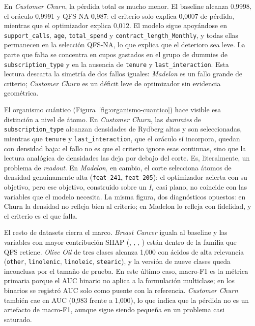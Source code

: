 En \textit{Customer Churn}, la pérdida total es mucho menor. El baseline
alcanza 0{,}9998, el oráculo 0{,}9991 y QFS-NA 0{,}987: el criterio solo
explica 0{,}0007 de pérdida, mientras que el optimizador explica 0{,}012.
El modelo sigue apoyándose en \texttt{support\_calls}, \texttt{age},
\texttt{total\_spend} y \texttt{contract\_length\_Monthly}, y todas
ellas permanecen en la selección QFS-NA, lo que explica que el deterioro
sea leve. La parte que falta se concentra en cupos gastados en el grupo
de dummies de \texttt{subscription\_type} y en la ausencia de
\texttt{tenure} y \texttt{last\_interaction}. Esta lectura descarta la simetría de dos
fallos iguales: \textit{Madelon} es un fallo grande de criterio;
\textit{Customer Churn} es un déficit leve de optimizador sin evidencia
geométrica.

El organismo cuántico (Figura~\ref{fig:organismo-cuantico}) hace visible
esa distinción a nivel de átomo. En \textit{Customer Churn}, las
\textit{dummies} de \texttt{subscription\_type} alcanzan densidades de
Rydberg altas y son seleccionadas, mientras que \texttt{tenure} y
\texttt{last\_interaction}, que el oráculo sí incorpora, quedan con
densidad baja: el fallo no es que el criterio ignore esas continuas, sino
que la lectura analógica de densidades las deja por debajo del corte. Es,
literalmente, un problema de \textit{readout}. En \textit{Madelon}, en
cambio, el corte selecciona átomos de densidad genuinamente alta
(\texttt{feat\_241}, \texttt{feat\_205}): el optimizador acierta con su
objetivo, pero ese objetivo, construido sobre un $I_i$ casi plano, no
coincide con las variables que el modelo necesita. La misma figura, dos
diagnósticos opuestos: en Churn la densidad no refleja bien al criterio;
en Madelon lo refleja con fidelidad, y el criterio es el que falla.

El resto de datasets cierra el marco. \textit{Breast Cancer} iguala al
baseline y las variables con mayor contribución SHAP
(, ,
, ) están dentro de
la familia que QFS retiene. \textit{Olive Oil} de tres clases alcanza
1{,}000 con ácidos de alta relevancia (\texttt{other},
\texttt{linolenic}, \texttt{linoleic}, \texttt{stearic}), y la versión
de nueve clases queda inconclusa por el tamaño de prueba. En este último
caso, macro-F1 es la métrica primaria porque el AUC binario no aplica a
la formulación multiclase; en los binarios se registró AUC solo como
puente con la referencia. \textit{Customer Churn} también cae en AUC
(0{,}983 frente a 1{,}000), lo que indica que la pérdida no es un artefacto
de macro-F1, aunque sigue siendo pequeña en un problema casi saturado.

